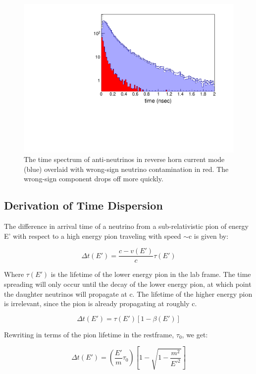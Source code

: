 \begin{figure}[t]
	\begin{center}
           	\includegraphics[width=0.5\linewidth]{Figures/2018.11.07_LBNFtimingRHC/RHCbeamcontent_log.pdf}
	\end{center}
	\caption{The time spectrum of anti-neutrinos in reverse horn
          current mode (blue) overlaid with wrong-sign neutrino
          contamination in red. The wrong-sign component drops off
          more quickly.}
		\label{fig:RHCbeamcontent_log}
\end{figure}

\subsection{Derivation of Time Dispersion}

The difference in arrival time of a neutrino from a sub-relativistic
pion of energy E' with respect to a high energy pion traveling with
speed $\sim$c is given by:

\begin{equation}
\Delta t(E') = \frac{c - v(E')}{c} \tau (E')
\end{equation}

Where $\tau (E')$ is the lifetime of the lower energy pion in the lab
frame. The time spreading will only occur until the decay of the lower
energy pion, at which point the daughter neutrinos will propagate at
c. The lifetime of the higher energy pion is irrelevant, since the
pion is already propagating at roughly c.

\begin{equation}
\Delta t(E') = \tau (E') [1 - \beta (E')]
\end{equation}

Rewriting in terms of the pion lifetime in the restframe, $\tau_0$, we get:

\begin{equation}
\Delta t(E') = \left(\frac{E'}{m} \tau_0\right) \left[1 - \sqrt{ 1 - \frac{m^2}{E'^2}} \right] 
\end{equation}

